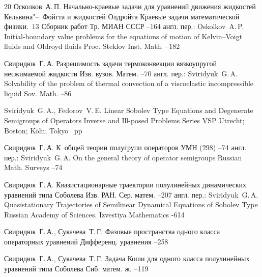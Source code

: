 \begin{thebibliography}{20}
\by Осколков~А.\,П.
\paper Начально-краевые задачи для уравнений движения жидкостей Кельвина"--~Фойгта и жидкостей Олдройта
\inbook Краевые задачи математической физики.~$13$
\bookinfo Сборник работ
\serial Тр. МИАН СССР
--164
\transl англ. пер.:
\by Oskolkov~A.\,P.
\paper Initial-boundary value problems for the equations of motion of Kelvin--Voigt fluids and Oldroyd fluids
\jour Proc. Steklov Inst. Math.
--182

\by Свиридюк~Г.\,А.
\paper Разрешимость задачи термоконвекции вязкоупругой несжимаемой жидкости
\jour Изв. вузов. Матем.
--70
\transl англ. пер.:
\by Sviridyuk~G.\,A.
\paper Solvability of the problem of thermal convection of a viscoelastic incompressible liquid
\jour  Sov. Math. 
--86


\by Sviridyuk~G.\,A., Fedorov~V.\,E.
\paper Linear Sobolev Type Equations and Degenerate Semigroups of Operators
\serial Inverse and Ill-posed Problems Series
\publ VSP
\publaddr Utrecht; Boston; K\"oln; Tokyo
~pp


\by Свиридюк~Г.\,А.
\paper К~общей теории полугрупп операторов
\jour УМН
(298)
--74
\transl англ. пер.:
\by Sviridyuk~G.\,A.
\paper On the general theory of operator semigroups
\jour Russian Math. Surveys
--74


\by Свиридюк~Г.\,А.
\paper Квазистационарные траектории полулинейных динамических уравнений типа Соболева
\jour Изв. РАН. Сер. матем.
--207
\transl
англ. пер.:
\by Sviridyuk~G.\,A.
\paper Quasistationary Trajectories of Semilinear Dynamical Equations of Sobolev Type
\jour Russian Academy of Sciences. Izvestiya Mathematics
-614



\by Свиридюк~Г.\,А., Сукачева~Т.\,Г.
\paper Фазовые пространства одного класса операторных уравнений 
\jour Дифференц. уравнения
--258

\by Свиридюк~Г.\,А., Сукачева~Т.\,Г.
\paper Задача Коши для одного класса полулинейных уравнений типа Соболева 
\jour Сиб. матем. ж.
--119


\end{thebibliography}
